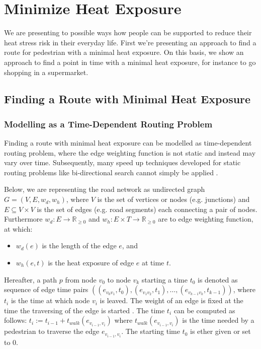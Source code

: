 
\section{Minimize Heat Exposure}

We are presenting to possible ways how people can be supported to reduce their heat stress risk in their everyday life. First we're presenting an approach to find a route for pedestrian with a minimal heat exposure. On this basis, we show an approach to find a point in time with a minimal heat exposure, for instance to go shopping in a supermarket.

\subsection{Finding a Route with Minimal Heat Exposure}

\subsubsection{Modelling as a Time-Dependent Routing Problem}

Finding a route with minimal heat exposure can be modelled as time-dependent routing problem, where the edge weighting function is not static and instead may vary over time. Subsequently, many speed up techniques developed for static routing problems like bi-directional search cannot simply be applied \parencite{Delling2009}. 

Below, we are representing the road network as undirected graph $G=(V,E,w_d,w_h)$, where $V$ is the set of vertices or nodes (e.g. junctions) and $E\subseteq V\times V$ is the set of edges (e.g. road segments) each connecting a pair of nodes. Furthermore $w_d: E \to \mathbb{R}_{\geq 0}$ and $w_h: E \times T \to \mathbb{R}_{\geq 0}$ are to edge weighting function, at which:
\begin{itemize}
	\item $w_d(e)$ is the length of the edge $e$, and
	\item $w_h(e, t)$ is the heat exposure of edge $e$ at time $t$.
\end{itemize}   
Hereafter, a path $p$ from node $v_0$ to node $v_k$ starting a time $t_0$ is denoted as sequence of edge time pairs $((e_{v_0v_1},t_0),(e_{v_1v_2},t_1),\dots, (e_{v_{k-1}v_k},t_{k-1}))$, where $t_i$ is the time at which node $v_i$ is leaved. The weight of an edge is fixed at the time the traversing of the edge is started \parencite[the so-called frozen link model,][]{Orda1990}. The time $t_i$ can be computed as follows: $t_i := t_{i-1} + t_{walk}(e_{v_{i-1},v_i})$ where $t_{walk}(e_{v_{i-1},v_i})$ is the time needed by a pedestrian to traverse the edge $e_{v_{i-1},v_i}$. The starting time $t_0$ is ether given or set to $0$. 

